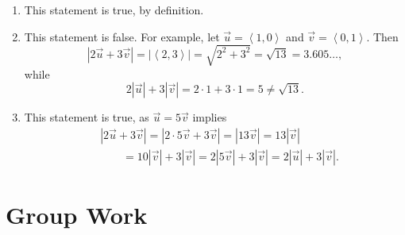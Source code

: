 \documentclass[handout,noauthor]{ximera}
\begin{document}
\begin{problem}
\begin{freeResponse}
\begin{enumerate}[label=(\alph*)]
\item This statement is true, by definition.
\item This statement is false. For example, let $\vec{u} = \left<1,0\right>$ and $\vec{v} = \left<0,1\right>$. Then
$$
\left|2\vec{u} + 3 \vec{v}\right| = \left|\left<2,3\right> \right| = \sqrt{2^2 + 3^2} = \sqrt{13} = 3.605\ldots,
$$
while
$$
2 \left|\vec{u}\right| + 3 \left|\vec{v}\right| = 2 \cdot 1 + 3 \cdot 1 = 5 \neq \sqrt{13}.
$$
\item This statement is true, as $\vec{u} = 5 \vec{v}$ implies
\begin{align*}
&\left| 2 \vec{u} + 3 \vec{v}\right| = \left| 2 \cdot 5 \vec{v} + 3 \vec{v}\right| = \left|13 \vec{v}\right| = 13 \left|\vec{v}\right|  \\
& \qquad = 10 \left|\vec{v}\right| + 3 \left|\vec{v} \right| = 2 \left|5\vec{v}\right| + 3 \left|\vec{v} \right| = 2 \left|\vec{u}\right| + 3 \left|\vec{v} \right|.
\end{align*}
\end{enumerate}

\end{freeResponse}
\end{problem}

\section{Group Work}
\end{document}
